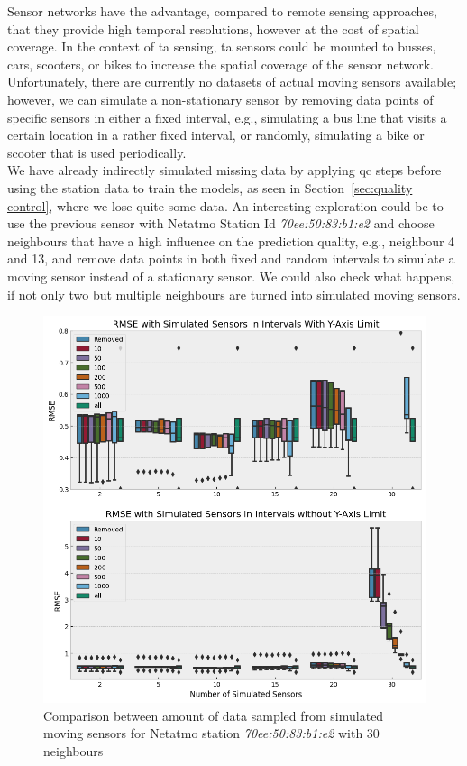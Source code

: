 
Sensor networks have the advantage, compared to remote sensing approaches, that they provide high temporal resolutions, however at the cost of spatial coverage. In the context of \gls{ta} sensing, \gls{ta} sensors could be mounted to busses, cars, scooters, or bikes to increase the spatial coverage of the sensor network. Unfortunately, there are currently no datasets of actual moving sensors available; however, we can simulate a non-stationary sensor by removing data points of specific sensors in either a fixed interval, e.g., simulating a bus line that visits a certain location in a rather fixed interval, or randomly, simulating a bike or scooter that is used periodically.\\
We have already indirectly simulated missing data by applying \gls{qc} steps before using the station data to train the models, as seen in Section~\ref{sec:quality control}, where we lose quite some data. An interesting exploration could be to use the previous sensor with Netatmo Station Id \textit{70ee:50:83:b1:e2} and choose neighbours that have a high influence on the prediction quality, e.g., neighbour 4 and 13, and remove data points in both fixed and random intervals to simulate a moving sensor instead of a stationary sensor. We could also check what happens, if not only two but multiple neighbours are turned into simulated moving sensors.\\

\begin{figure}[ht]
    \centering
    \includegraphics[width=1\textwidth]{images/eval_moving_sensors_hamburg.png}
    \caption{Comparison between amount of data sampled from simulated moving sensors for Netatmo station \textit{70ee:50:83:b1:e2} with 30 neighbours}
    \label{fig:eval moving sensors}
\end{figure}

